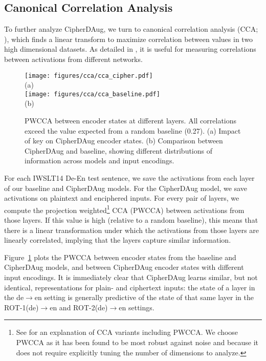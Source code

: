 \documentclass[11pt]{article}
\begin{document}
\subsection{Canonical Correlation Analysis}
To further analyze CipherDAug, we turn to canonical correlation analysis (CCA; \citealt{cca,svcca}), 
which finds a linear transform to maximize correlation between values in two high dimensional datasets. As detailed in \citealt{svcca}, it is useful for measuring correlations between activations from different networks.
\begin{figure}[t]
    \centering
    \vspace{-4.5em}
    \texttt{[image: figures/cca/cca\_cipher.pdf]}\\[-0.5in]
    \small(a)\\[-0.8in]
    \texttt{[image: figures/cca/cca\_baseline.pdf]}\\[-0.7in]
    \small(b)
    \caption{PWCCA between encoder states at different layers. 
    All correlations exceed the value expected from a random baseline (0.27).
    (a) Impact of key on CipherDAug encoder states. (b) Comparison between CipherDAug and baseline, showing different distributions of information across models and input encodings.}
    \label{fig:pwcca}
    \vspace{-1.5em}
\end{figure}

For each IWSLT14 De-En test sentence, we save the activations from each layer of our baseline and CipherDAug models. For the CipherDAug model, we save activations on plaintext and enciphered inputs. 
For every pair of layers, we compute the projection weighted\footnote{See \citealt{svcca} for an explanation of CCA variants including PWCCA. We choose PWCCA as it has been found to be most robust against noise and because it does not require explicitly tuning the number of dimensions to analyze.} CCA (PWCCA) between activations from those layers. If this value is high (relative to a random baseline), this means that there is a linear transformation under which the activations from those layers are linearly correlated, implying that the layers capture similar information. 

Figure~\ref{fig:pwcca} plots the PWCCA between encoder states from the baseline and CipherDAug models, and between CipherDAug encoder states with different input encodings.
It is immediately clear that CipherDAug learns similar, but not identical, representations for plain- and ciphertext inputs: the state of a layer in the de$\rightarrow$en setting is generally predictive of the state of that same layer in the ROT-1(de)$\rightarrow$en and ROT-2(de)$\rightarrow$en settings. 
\end{document}
